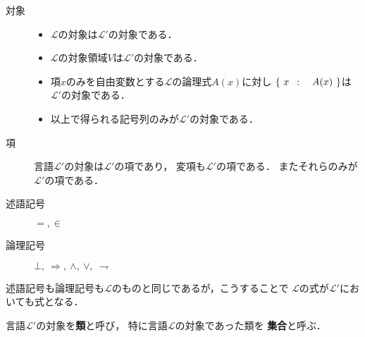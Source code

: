 	\begin{description}
		\item[対象]
			\begin{itemize}
				\item $\mathcal{L}$の対象は$\mathcal{L}'$の対象である．
				\item $\mathcal{L}$の対象領域$V$は$\mathcal{L}'$の対象である．
				\item 項$x$のみを自由変数とする$\mathcal{L}$の論理式$A(x)$に対し
					$\left\{\ x\ \, : \quad A(x)\ \right\}$は$\mathcal{L}'$の対象である．
				\item 以上で得られる記号列のみが$\mathcal{L}'$の対象である．
			\end{itemize}
			
		\item[項] 
			言語$\mathcal{L}'$の対象は$\mathcal{L}'$の項であり，
			変項も$\mathcal{L}'$の項である．
			またそれらのみが$\mathcal{L}'$の項である．
			
		\item[述語記号] $=,\in$
		\item[論理記号] $\bot,\ \Longrightarrow,\ \wedge,\ \vee,\ \rightharpoondown$
	\end{description}
	
	述語記号も論理記号も$\mathcal{L}$のものと同じであるが，こうすることで
	$\mathcal{L}$の式が$\mathcal{L}'$においても式となる．
	\begin{comment}
	\begin{itembox}[l]{研究室にて}
		ポスドク「今回の言語の拡張では新造語を取り入れた．
			身近な例として最近ではネットスラングが国語辞書に載ったりしているね．
			日常生活で新造語が出来ても文法まではなかなか変わらないように，
			述語記号や論理記号は言語を拡張しても変えなかった．むしろ変えてしまうと不便で不都合だ．
			対象領域$V$が$\mathcal{L}'$の項になっているのは，
			新造語が出現して初めて旧来の言語というカテゴリーが意識されたと解釈できるかな．
			まあ実際は別の意図があるのだけれど…」
	\end{itembox}
	\end{comment}
	
	\begin{screen}
		\begin{dfn}[類・集合]
			言語$\mathcal{L}'$の対象を{\bf 類}と呼び，
			特に言語$\mathcal{L}$の対象であった類を
			{\bf 集合}と呼ぶ．
		\end{dfn}
	\end{screen}
	
